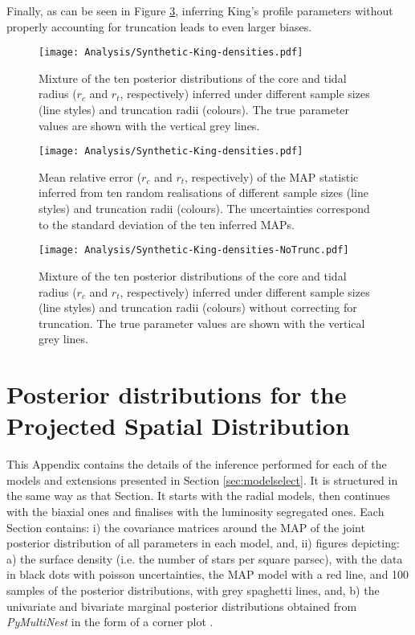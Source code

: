 Finally, as can be seen in Figure \ref{fig:KingSynNoTrunc}, inferring King's profile parameters without properly accounting for truncation leads to even larger biases.

\begin {figure}[ht!]
 \centering
  \texttt{[image: Analysis/Synthetic-King-densities.pdf]}
  \caption{Mixture of the ten posterior distributions of the core and tidal radius ($r_c$ and $r_t$, respectively) inferred under different sample sizes (line styles) and truncation radii (colours). The true parameter values are shown with the vertical grey lines.}
\label{fig:KingSyn}
\end {figure}

\begin {figure}[ht!]
 \centering
  \texttt{[image: Analysis/Synthetic-King-densities.pdf]}
  \caption{Mean relative error ($r_c$ and $r_t$, respectively) of the MAP statistic inferred from ten random realisations of different sample sizes (line styles) and truncation radii (colours). The uncertainties correspond to the standard deviation of the ten inferred MAPs.}
\label{fig:KingSynMRE}
\end {figure}

\begin {figure}[ht!]
 \centering
  \texttt{[image: Analysis/Synthetic-King-densities-NoTrunc.pdf]}
  \caption{Mixture of the ten posterior distributions of the core and tidal radius ($r_c$ and $r_t$, respectively) inferred under different sample sizes (line styles) and truncation radii (colours) without correcting for truncation. The true parameter values are shown with the vertical grey lines.}
\label{fig:KingSynNoTrunc}
\end {figure}

\chapter{Posterior distributions for the Projected Spatial Distribution \label{app:posteriors}}

 This Appendix contains the details of the inference performed for each of the models and extensions presented in Section \ref{sec:modelselect}.
 It is structured in the same way as that Section. It starts with the radial models, then continues with the biaxial ones and finalises with the
 luminosity segregated ones. Each Section contains: i) the covariance matrices around the MAP of the joint posterior distribution of all parameters in each model, and, ii) figures depicting:  a) the surface density (i.e. the number of stars per square parsec), with the data in black dots with poisson uncertainties, the MAP model with a red line, and 100 samples of the posterior distributions, with grey spaghetti lines, and, b) the univariate and bivariate marginal posterior distributions obtained from \emph{PyMultiNest} in the form of a corner plot \citep{corner}.
 
